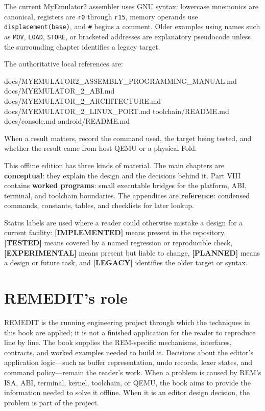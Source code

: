 \documentclass[
  oneside,
  openany]{book}
\newenvironment{Shaded}{\begin{snugshade}}{\end{snugshade}}
\newcommand{\NormalTok}[1]{#1}
\begin{document}
The current MyEmulator2 assembler uses GNU syntax: lowercase mnemonics
are canonical, registers are \texttt{r0} through \texttt{r15}, memory
operands use \texttt{displacement(base)}, and \texttt{\#} begins a
comment. Older examples using names such as \texttt{MOV}, \texttt{LOAD},
\texttt{STORE}, or bracketed addresses are explanatory pseudocode unless
the surrounding chapter identifies a legacy target.

The authoritative local references are:

\begin{Shaded}
\begin{Highlighting}[]
\NormalTok{docs/MYEMULATOR2\_ASSEMBLY\_PROGRAMMING\_MANUAL.md}
\NormalTok{docs/MYEMULATOR\_2\_ABI.md}
\NormalTok{docs/MYEMULATOR\_2\_ARCHITECTURE.md}
\NormalTok{docs/MYEMULATOR\_2\_LINUX\_PORT.md}
\NormalTok{toolchain/README.md}
\NormalTok{docs/console.md}
\NormalTok{android/README.md}
\end{Highlighting}
\end{Shaded}

When a result matters, record the command used, the target being tested,
and whether the result came from host QEMU or a physical Fold.

This offline edition has three kinds of material. The main chapters are
\textbf{conceptual}: they explain the design and the decisions behind
it. Part VIII contains \textbf{worked programs}: small executable
bridges for the platform, ABI, terminal, and toolchain boundaries. The
appendices are \textbf{reference}: condensed commands, constants,
tables, and checklists for later lookup.

Status labels are used where a reader could otherwise mistake a design
for a current facility: \textbf{{[}IMPLEMENTED{]}} means present in the
repository, \textbf{{[}TESTED{]}} means covered by a named regression or
reproducible check, \textbf{{[}EXPERIMENTAL{]}} means present but liable
to change, \textbf{{[}PLANNED{]}} means a design or future task, and
\textbf{{[}LEGACY{]}} identifies the older target or syntax.

\hypertarget{remedits-role}{%
\section{REMEDIT's role}\label{remedits-role}}

REMEDIT is the running engineering project through which the techniques
in this book are applied; it is not a finished application for the
reader to reproduce line by line. The book supplies the REM-specific
mechanisms, interfaces, contracts, and worked examples needed to build
it. Decisions about the editor's application logic---such as buffer
representation, undo records, lexer states, and command policy---remain
the reader's work. When a problem is caused by REM's ISA, ABI, terminal,
kernel, toolchain, or QEMU, the book aims to provide the information
needed to solve it offline. When it is an editor design decision, the
problem is part of the project.
\end{document}

